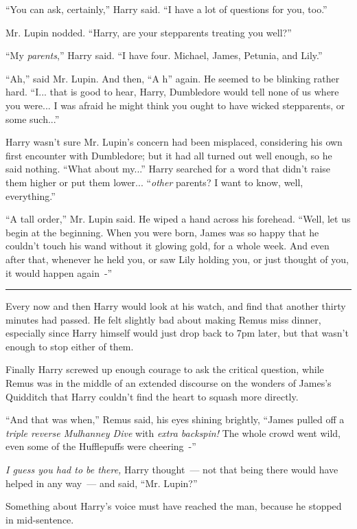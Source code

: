 ``You can ask, certainly,'' Harry said. ``I have a lot of questions for you, too.''

Mr. Lupin nodded. ``Harry, are your stepparents treating you well?''

``My \emph{parents},'' Harry said. ``I have four. Michael, James, Petunia, and Lily.''

``Ah,'' said Mr. Lupin. And then, ``A h'' again. He seemed to be blinking rather hard. ``I... that is good to hear, Harry, Dumbledore would tell none of us where you were... I was afraid he might think you ought to have wicked stepparents, or some such...''

Harry wasn't sure Mr. Lupin's concern had been misplaced, considering his own first encounter with Dumbledore; but it had all turned out well enough, so he said nothing. ``What about my...'' Harry searched for a word that didn't raise them higher or put them lower... ``\emph{other} parents? I want to know, well, everything.''

``A tall order,'' Mr. Lupin said. He wiped a hand across his forehead. ``Well, let us begin at the beginning. When you were born, James was so happy that he couldn't touch his wand without it glowing gold, for a whole week. And even after that, whenever he held you, or saw Lily holding you, or just thought of you, it would happen again~-''

\begin{center}\rule{3in}{0.4pt}\end{center}

Every now and then Harry would look at his watch, and find that another thirty minutes had passed. He felt slightly bad about making Remus miss dinner, especially since Harry himself would just drop back to 7pm later, but that wasn't enough to stop either of them.

Finally Harry screwed up enough courage to ask the critical question, while Remus was in the middle of an extended discourse on the wonders of James's Quidditch that Harry couldn't find the heart to squash more directly.

``And that was when,'' Remus said, his eyes shining brightly, ``James pulled off a \emph{triple reverse Mulhanney Dive} with \emph{extra backspin!} The whole crowd went wild, even some of the Hufflepuffs were cheering~-''

\emph{I guess you had to be there,} Harry thought~--- not that being there would have helped in any way~--- and said, ``Mr. Lupin?''

Something about Harry's voice must have reached the man, because he stopped in mid-sentence.

